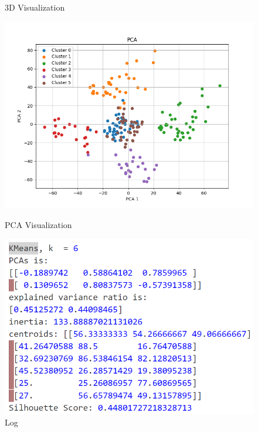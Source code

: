 \documentclass[8pt]{article}
\begin{document}
\begin{figure}[H]
\begin{minipage}{0.32\textwidth}
        \caption{3D Visualization}
        \label{fig: 3D Visualization k6 rand14 pp}
    \end{minipage}
    \hfill
    \begin{minipage}{0.32\textwidth}
        \centering
        \includegraphics[width=\textwidth]{./Prob4/out/task2_rand14/images/PCA_k6.png}
        \caption{PCA Visualization}
        \label{fig: PCA Visualization k6 rand14 pp}
    \end{minipage}
    \hfill
    \begin{minipage}{0.32\textwidth}
        \centering
        \includegraphics[width=\textwidth]{./Prob4/out/task2_rand14/log_k6.png}
        \caption{Log}
        \label{fig: log_k6.png rand14 pp}
    \end{minipage}
\end{figure}
\end{document}
